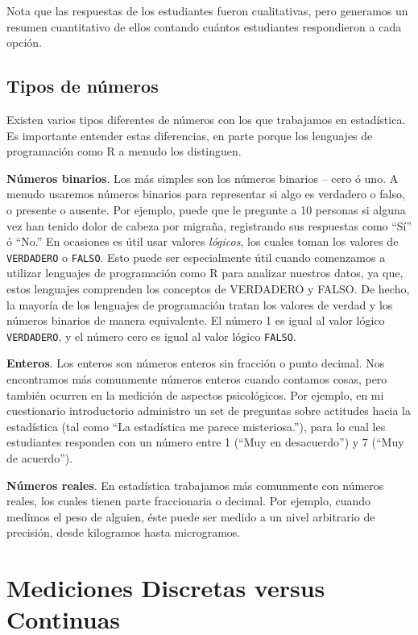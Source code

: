 \documentclass[
  12pt,
]{book}
\theoremstyle{definition}
\theoremstyle{definition}
\theoremstyle{definition}
\theoremstyle{remark}
\begin{document}
Nota que las respuestas de los estudiantes fueron cualitativas, pero generamos un resumen cuantitativo de ellos contando cuántos estudiantes respondieron a cada opción.

\hypertarget{tipos-de-nuxfameros}{%
\subsection{Tipos de números}\label{tipos-de-nuxfameros}}

Existen varios tipos diferentes de números con los que trabajamos en estadística. Es importante entender estas diferencias, en parte porque los lenguajes de programación como R a menudo los distinguen.

\textbf{Números binarios}. Los más simples son los números binarios -- cero ó uno. A menudo usaremos números binarios para representar si algo es verdadero o falso, o presente o ausente. Por ejemplo, puede que le pregunte a 10 personas si alguna vez han tenido dolor de cabeza por migraña, registrando sus respuestas como ``Sí'' ó ``No.'' En ocasiones es útil usar valores \emph{lógicos}, los cuales toman los valores de \texttt{VERDADERO} o \texttt{FALSO}. Esto puede ser especialmente útil cuando comenzamos a utilizar lenguajes de programación como R para analizar nuestros datos, ya que, estos lenguajes comprenden los conceptos de VERDADERO y FALSO. De hecho, la mayoría de los lenguajes de programación tratan los valores de verdad y los números binarios de manera equivalente. El número 1 es igual al valor lógico \texttt{VERDADERO}, y el número cero es igual al valor lógico \texttt{FALSO}.

\textbf{Enteros}. Los enteros son números enteros sin fracción o punto decimal. Nos encontramos más comunmente números enteros cuando contamos cosas, pero también ocurren en la medición de aspectos psicológicos. Por ejemplo, en mi cuestionario introductorio administro un set de preguntas sobre actitudes hacia la estadística (tal como ``La estadística me parece misteriosa.''), para lo cual les estudiantes responden con un número entre 1 (``Muy en desacuerdo'') y 7 (``Muy de acuerdo'').

\textbf{Números reales}. En estadística trabajamos más comunmente con números reales, los cuales tienen parte fraccionaria o decimal. Por ejemplo, cuando medimos el peso de alguien, éste puede ser medido a un nivel arbitrario de precisión, desde kilogramos hasta microgramos.

\hypertarget{mediciones-discretas-versus-continuas}{%
\section{Mediciones Discretas versus Continuas}\label{mediciones-discretas-versus-continuas}}
\end{document}

